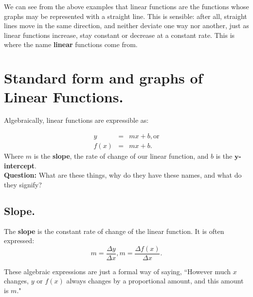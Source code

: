 We can see from the above examples that linear functions are the functions whose graphs may be represented with a straight line.  This is sensible: after all, straight lines move in the same direction, and neither deviate one way nor another, just as linear functions increase, stay constant or decrease at a constant rate.  This is where the name \textbf{linear} functions come from.\\


\section{Standard form and graphs of Linear Functions.}

Algebraically, linear functions are expressible as:

\begin{eqnarray*}
y&=&mx+b, \text{or}\\
f(x)&=&mx+b.
\end{eqnarray*}
%
Where $m$ is the \textbf{slope}, the rate of change of our linear function, and $b$ is the $\mathbf{y}$\textbf{-intercept}.\\



\textbf{Question:} What are these things, why do they have these names, and what do they signify?\\


\subsection{Slope.}


The \textbf{slope} is the constant rate of change of the linear function.  It is often expressed: $$m=\frac{\Delta y}{\Delta x}, m=\frac{\Delta f(x)}{\Delta x}.$$

These algebraic expressions are just a formal way of saying, ``However much $x$ changes, $y$ or $f(x)$ always changes by a proportional amount, and this amount is $m$."


